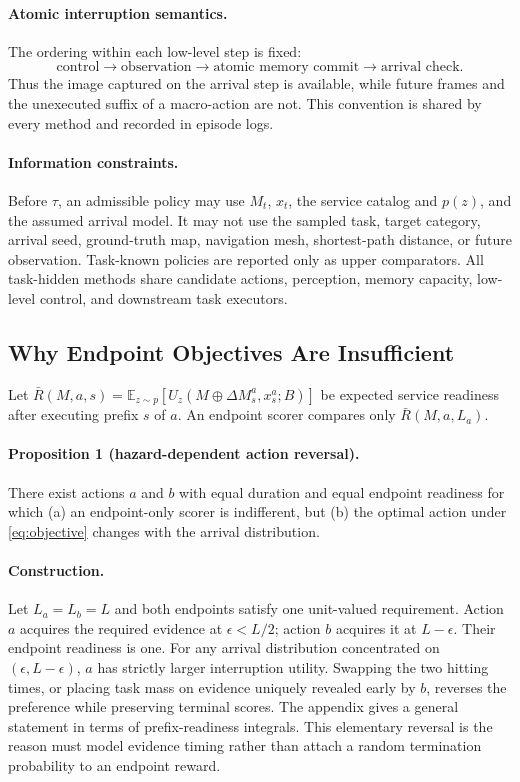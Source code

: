 \paragraph{Atomic interruption semantics.}
The ordering within each low-level step is fixed:
\begin{equation}
\text{control} \rightarrow \text{observation}
\rightarrow \text{atomic memory commit}
\rightarrow \text{arrival check}.
\end{equation}
Thus the image captured on the arrival step is available, while future frames and the unexecuted suffix of a macro-action are not.
This convention is shared by every method and recorded in episode logs.

\paragraph{Information constraints.}
Before $\tau$, an admissible policy may use $M_t$, $x_t$, the service catalog and $p(z)$, and the assumed arrival model.
It may not use the sampled task, target category, arrival seed, ground-truth map, navigation mesh, shortest-path distance, or future observation.
Task-known policies are reported only as upper comparators.
All task-hidden methods share candidate actions, perception, memory capacity, low-level control, and downstream task executors.

\subsection{Why Endpoint Objectives Are Insufficient}
\label{sec:endpoint}

Let $\bar R(M,a,s)=\mathbb{E}_{z\sim p}[U_z(M\oplus\Delta M^a_s,x^a_s;B)]$
be expected service readiness after executing prefix $s$ of $a$.
An endpoint scorer compares only $\bar R(M,a,L_a)$.

\paragraph{Proposition 1 (hazard-dependent action reversal).}
There exist actions $a$ and $b$ with equal duration and equal endpoint readiness for which
(a) an endpoint-only scorer is indifferent, but
(b) the optimal action under \cref{eq:objective} changes with the arrival distribution.

\paragraph{Construction.}
Let $L_a=L_b=L$ and both endpoints satisfy one unit-valued requirement.
Action $a$ acquires the required evidence at $\epsilon<L/2$; action $b$ acquires it at $L-\epsilon$.
Their endpoint readiness is one.
For any arrival distribution concentrated on $(\epsilon,L-\epsilon)$, $a$ has strictly larger interruption utility.
Swapping the two hitting times, or placing task mass on evidence uniquely revealed early by $b$, reverses the preference while preserving terminal scores.
The appendix gives a general statement in terms of prefix-readiness integrals.
This elementary reversal is the reason \taskname{} must model evidence timing rather than attach a random termination probability to an endpoint reward.

